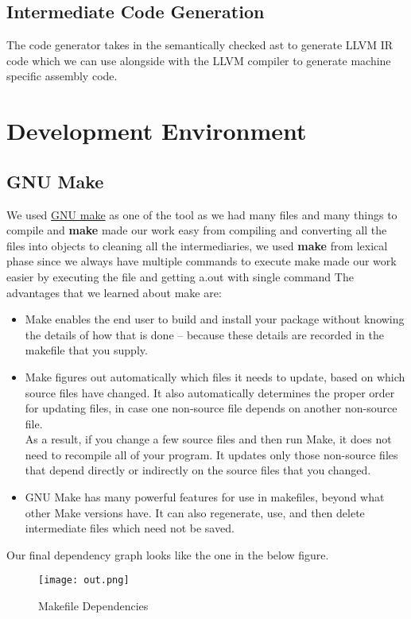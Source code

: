 \documentclass[english,a4paper,12pt]{report}
\begin{document}
    \section{Intermediate Code Generation}
    The code generator takes in the semantically checked ast to generate LLVM IR code which we can use alongside with the LLVM compiler to generate machine specific assembly code. 

\chapter{Development Environment}
\section{GNU Make}
  We used \href{https://www.gnu.org/software/make/}{GNU make} as one of the tool as we had many files and many things to compile and \textbf{make} made our work easy from compiling and converting all the files into objects to cleaning all the intermediaries, we used \textbf{make} from lexical phase
  since we always have multiple commands to execute make made our work easier by executing the file and getting a.out with single command
  The advantages that we learned about make are:
  \begin{itemize}
      \item Make enables the end user to build and install your package without knowing the details of how that is done -- because these details are recorded in the makefile that you supply.
      \item Make figures out automatically which files it needs to update, based on which source files have changed. It also automatically determines the proper order for updating files, in case one non-source file depends on another non-source file.\\ 
      As a result, if you change a few source files and then run Make, it does not need to recompile all of your program. It updates only those non-source files that depend directly or indirectly on the source files that you changed.
      \item GNU Make has many powerful features for use in makefiles, beyond what other Make versions have. It can also regenerate, use, and then delete intermediate files which need not be saved.
  \end{itemize}
  Our final dependency graph looks like the one in the below figure.
 \begin{figure}[H]
 \texttt{[image: out.png]}
 \caption{Makefile Dependencies}
\end{figure}
  
\end{document}
